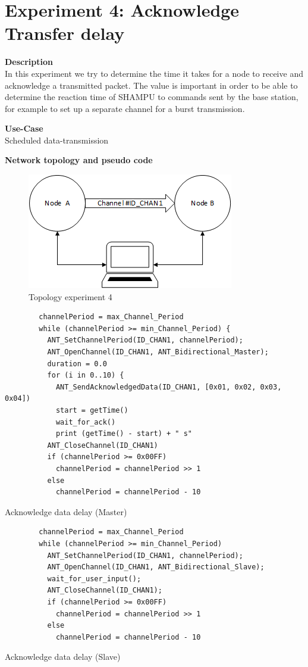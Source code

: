 \section{Experiment 4: Acknowledge Transfer delay}
\begin{description} 
	\item{\textbf{Description}} \hfill \\ In this experiment we try to determine the time it takes for a node to receive and acknowledge a transmitted packet. The value is important in order to be able to determine the reaction time of SHAMPU to commands sent by the base station, for example to set up a separate channel for a burst transmission.
	\item{\textbf{Use-Case}} \hfill \\ Scheduled data-transmission
	\item{\textbf{Network topology and pseudo code}} \hfill \\ 
	\begin{figure}[H]
		\centering
		\includegraphics[scale=1]{content/images/exp_topo.png}
		\caption{Topology experiment 4}
	\end{figure}
	\begin{code}[H]
		\begin{verbatim}
		channelPeriod = max_Channel_Period
		while (channelPeriod >= min_Channel_Period) {
		  ANT_SetChannelPeriod(ID_CHAN1, channelPeriod);
		  ANT_OpenChannel(ID_CHAN1, ANT_Bidirectional_Master);
		  duration = 0.0
		  for (i in 0..10) {
		    ANT_SendAcknowledgedData(ID_CHAN1, [0x01, 0x02, 0x03, 0x04])
		    start = getTime()	   
		    wait_for_ack()		
		    print (getTime() - start) + " s"	  
		  ANT_CloseChannel(ID_CHAN1)		
		  if (channelPeriod >= 0x00FF)
		    channelPeriod = channelPeriod >> 1
		  else
		    channelPeriod = channelPeriod - 10
		\end{verbatim}
		\caption{Acknowledge data delay (Master)}\label{lst:mExp4}
	\end{code}
	
	\begin{code}[H]
		\begin{verbatim}
		channelPeriod = max_Channel_Period
		while (channelPeriod >= min_Channel_Period)
		  ANT_SetChannelPeriod(ID_CHAN1, channelPeriod);
		  ANT_OpenChannel(ID_CHAN1, ANT_Bidirectional_Slave);				 
		  wait_for_user_input();
		  ANT_CloseChannel(ID_CHAN1);
		  if (channelPeriod >= 0x00FF)
		    channelPeriod = channelPeriod >> 1
		  else
		    channelPeriod = channelPeriod - 10
		\end{verbatim}
		\caption{Acknowledge data delay (Slave)}\label{lst:sExp4}
	\end{code}
	

\end{description}
